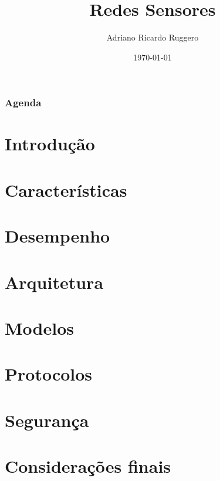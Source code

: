 \documentclass[notes]{beamer}
\title{Redes Sensores}
\subtitle{}
\author{Adriano Ricardo Ruggero}
\institute{Instituto de Computação - Unicamp}
\date{\today}
\begin{document}
\begin{frame}
  \titlepage
\end{frame}

\begin{frame}
  \frametitle{Agenda}
  \tableofcontents
\end{frame}

\section{Introdução}

\section{Características}

\section{Desempenho}

\section{Arquitetura}

\section{Modelos}

\section{Protocolos}

\section{Segurança}

\section{Considerações finais}
\end{document}
